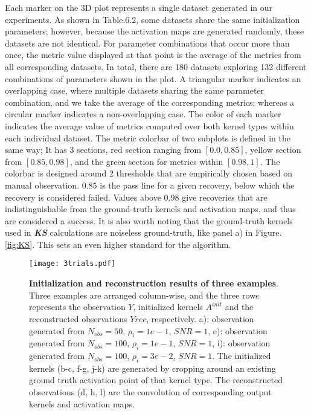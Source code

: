 Each marker on the 3D plot represents a single dataset generated in our experiments. As shown in Table.6.2, some datasets share the same initialization parameters; however, because the activation maps are generated randomly, these datasets are not identical. For parameter combinations that occur more than once, the metric value displayed at that point is the average of the metrics from all corresponding datasets. In total, there are 180 datasets exploring 132 different combinations of parameters shown in the plot. A triangular marker indicates an overlapping case, where multiple datasets sharing the same parameter combination, and we take the average of the corresponding metrics; whereas a circular marker indicates a non-overlapping case. The color of each marker indicates the average value of metrics computed over both kernel types within each individual dataset. The metric colorbar of two subplots is defined in the same way; It has 3 sections, red section ranging from $[0.0, 0.85]$, yellow section from $[0.85,0.98]$, and the green section for metrics within $[0.98,1]$. The colorbar is designed around 2 thresholds that are empirically chosen based on manual observation. $0.85$ is the pass line for a given recovery, below which the recovery is considered failed. Values above $0.98$ give recoveries that are indistinguishable from the ground-truth kernels and activation maps, and thus are considered a success. It is also worth noting that the ground-truth kernels used in \textbf{\textit{KS}} calculations are noiseless ground-truth, like panel a) in Figure. \ref{fig:KS}. This sets an even higher standard for the algorithm. 

\begin{figure}
	\texttt{[image: 3trials.pdf]} 
	\centering
	\caption[\textbf{Initialization and reconstruction results of three examples}]{\textbf{Initialization and reconstruction results of three examples}. Three examples are arranged column-wise, and the three rows represents the observation $Y$, initialized kernels $A^{init}$ and the reconstructed observations $Y{rec}$, respectively. a): observation generated from $N_{obs} = 50$, $\rho_i = 1e-1$, $SNR = 1$, e): observation generated from $N_{obs} = 100$, $\rho_i = 1e-1$, $SNR = 1$, i): observation generated from $N_{obs} = 100$, $\rho_i = 3e-2$, $SNR = 1$. The initialized kernels (b-c, f-g, j-k) are generated by cropping around an existing ground truth activation point of that kernel type. The reconstructed observations (d, h, l) are the convolution of corresponding output kernels and activation maps.}
	\label{fig:regimes}
\end{figure}

